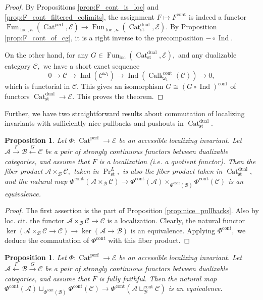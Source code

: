 \documentclass[11pt,leqno]{amsart}
\newtheorem{prop}[theo]{Proposition}
\numberwithin{equation}{section}
\newcommand{\xto}{\xrightarrow}
\newcommand{\xlto}{\xleftarrow}
\newcommand{\Cat}{\operatorname{Cat}}
\newcommand{\loc}{\operatorname{loc}}
\newcommand{\cont}{\operatorname{cont}}
\newcommand{\st}{\operatorname{st}}
\newcommand{\dual}{\operatorname{dual}}
\newcommand{\cA}{{\mathcal A}}
\newcommand{\cB}{{\mathcal B}}
\newcommand{\cC}{{\mathcal C}}
\newcommand{\cE}{{\mathcal E}}
\newcommand{\Fun}{\operatorname{Fun}}
\newcommand{\perf}{\operatorname{perf}}
\newcommand{\Ind}{\operatorname{Ind}}
\newcommand{\Calk}{\operatorname{Calk}}
\begin{document}
\begin{proof} By Propositions \ref{prop:F_cont_is_loc} and \ref{prop:F_cont_filtered_colimits}, the assignment $F\mapsto F^{\cont}$ is indeed a functor $\Fun_{\loc,\kappa}(\Cat^{\perf},\cE)\to \Fun_{\loc,\kappa}(\Cat_{\st}^{\dual},\cE).$ By Proposition \ref{prop:F_cont_of_cg}, it is a right inverse to the precomposition $-\circ\Ind.$

On the other hand, for any $G\in\Fun_{\loc}(\Cat_{\st}^{\dual},\cE),$ and any dualizable category $\cC,$ we have a short exact sequence 
$$0\to\cC\to\Ind(\cC^{\omega_1})\to\Ind(\Calk_{\omega_1}^{\cont}(\cC))\to 0,$$ which is functorial in $\cC.$ This gives an isomorphism $G\cong (G\circ\Ind)^{\cont}$ of functors $\Cat_{\st}^{\dual}\to \cE.$ This proves the theorem.\end{proof}

Further, we have two straightforward results about commutation of localizing invariants with sufficiently nice pullbacks and pushouts in $\Cat_{\st}^{\dual}.$

\begin{prop}\label{prop:F_cont_nice_pullbacks} Let $\Phi:\Cat^{\perf}\to\cE$ be an accessible localizing invariant. Let $\cA\xto{F}\cB\xlto{G}\cC$ be a pair of strongly continuous functors between dualizable categories, and assume that $F$ is a localization (i.e. a quotient functor). Then the fiber product $\cA\times_{\cB}\cC,$ taken in $\Pr^L_{\st},$ is also the fiber product taken in $\Cat_{\st}^{\dual},$ and the natural map $\Phi^{\cont}(\cA\times_{\cB}\cC)\to \Phi^{\cont}(\cA)\times_{\Phi^{\cont}(\cB)}\Phi^{\cont}(\cC)$ is an equivalence.\end{prop}

\begin{proof}The first assertion is the part of Proposition \ref{prop:nice_pullbacks}. Also by loc. cit. the functor $\cA\times_{\cB}\cC\to\cC$ is a localization. Clearly, the natural functor $\ker(\cA\times_{\cB}\cC\to\cC)\to \ker(\cA\to\cB)$ is an equivalence. Applying $\Phi^{\cont},$ we deduce the commutation of $\Phi^{\cont}$ with this fiber product.\end{proof}

\begin{prop}\label{prop:F_cont_nice_pushouts} Let $\Phi:\Cat^{\perf}\to\cE$ be an accessible localizing invariant. Let $\cA\xlto{F}\cB\xto{G}\cC$ be a pair of strongly continuous functors between dualizable categories, and assume that $F$ is fully faithful. Then the natural map $\Phi^{\cont}(\cA)\sqcup_{\Phi^{\cont}(\cB)}\Phi^{\cont}(\cC)\to \Phi^{\cont}(\cA\sqcup_{\cB}^{\cont}\cC)$ is an equivalence.\end{prop}
\end{document}
